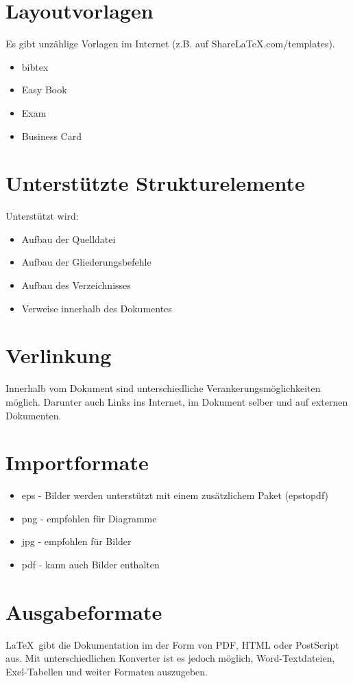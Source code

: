 \documentclass{article}
\begin{document}
\section{Layoutvorlagen}
Es gibt unzählige Vorlagen im Internet (z.B. auf ShareLaTeX.com/templates).
\begin{itemize}
	\item bibtex
	\item Easy Book
	\item Exam
	\item Business Card
\end{itemize}

\section{Unterstützte Strukturelemente}
Unterstützt wird:
\begin{itemize}
	\item Aufbau der Quelldatei
	\item Aufbau der Gliederungsbefehle
	\item Aufbau des Verzeichnisses
	\item Verweise innerhalb des Dokumentes
\end{itemize}

\section{Verlinkung}
Innerhalb vom Dokument sind unterschiedliche Verankerungsmöglichkeiten möglich. Darunter auch Links ins Internet, im Dokument selber und auf externen Dokumenten.

\section{Importformate}
\begin{itemize}
	\item eps - Bilder werden unterstützt mit einem zusätzlichem Paket (epstopdf)
	\item png - empfohlen für Diagramme
	\item jpg - empfohlen für Bilder
	\item pdf - kann auch Bilder enthalten
\end{itemize}

\section{Ausgabeformate}
\LaTeX\ gibt die Dokumentation im der Form von PDF, HTML oder PostScript aus. Mit unterschiedlichen Konverter ist es jedoch möglich, Word-Textdateien, Exel-Tabellen und weiter Formaten auszugeben.
\end{document}
